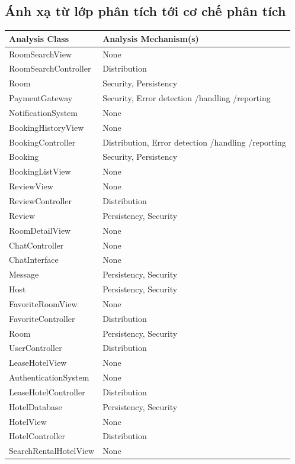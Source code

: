 \subsection{Ánh xạ từ lớp phân tích tới cơ chế phân tích}
\begin{longtable}{|p{6cm}|p{9cm}|}
\hline
\textbf{Analysis Class} & \textbf{Analysis Mechanism(s)} \\
\hline
RoomSearchView & None \\
\hline
RoomSearchController & Distribution \\
\hline
Room & Security, Persistency \\
\hline
PaymentGateway & Security, Error detection /handling /reporting \\
\hline
NotificationSystem & None \\
\hline
BookingHistoryView & None \\
\hline
BookingController & Distribution, Error detection /handling /reporting \\
\hline
Booking & Security, Persistency \\
\hline
BookingListView & None \\
\hline
ReviewView & None \\
\hline
ReviewController & Distribution \\
\hline
Review & Persistency, Security \\
\hline
RoomDetailView & None \\
\hline
ChatController & None \\
\hline
ChatInterface & None \\
\hline
Message & Persistency, Security \\
\hline
Host & Persistency, Security \\
\hline
FavoriteRoomView & None \\
\hline
FavoriteController & Distribution \\
\hline
Room & Persistency, Security \\
\hline
UserController & Distribution \\
\hline
LeaseHotelView & None \\
\hline
AuthenticationSystem & None \\
\hline
LeaseHotelController & Distribution \\
\hline
HotelDatabase & Persistency, Security \\
\hline
HotelView & None \\
\hline
HotelController & Distribution \\
\hline
SearchRentalHotelView & None \\

\end{longtable}
